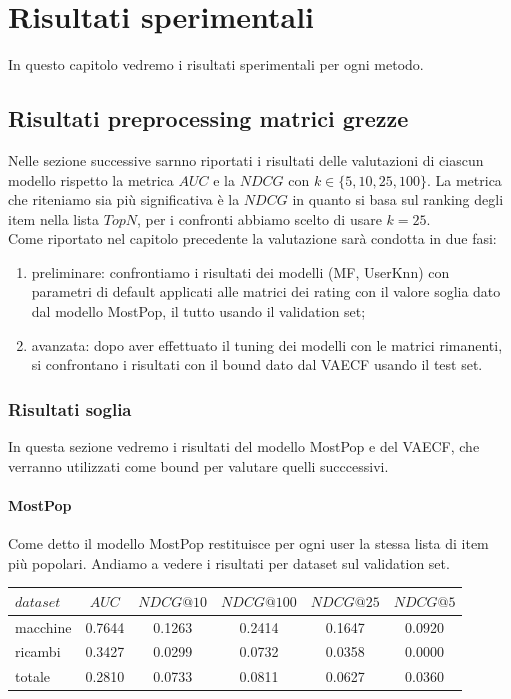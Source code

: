 \hypertarget{(chap:capitolo6)}{}
\chapter{Risultati sperimentali}
In questo capitolo vedremo i risultati sperimentali per ogni metodo.
\section{Risultati preprocessing matrici grezze}
Nelle sezione successive sarnno riportati i risultati delle valutazioni di ciascun modello rispetto la metrica $AUC$ e la $NDCG$ con $k\in \{5, 10, 25, 100\}$.
La metrica che riteniamo sia più significativa è la $NDCG$ in quanto si basa sul ranking degli item nella lista $TopN$, per i confronti abbiamo scelto di usare $k=25$.\\
Come riportato nel capitolo precedente la valutazione sarà condotta in due fasi: 
\begin{enumerate}
    \item preliminare: confrontiamo i risultati dei modelli (MF, UserKnn) con parametri di default applicati alle matrici dei rating con il valore soglia dato dal modello MostPop, il tutto usando il validation set;
    \item avanzata: dopo aver effettuato il tuning dei modelli con le matrici rimanenti, si confrontano i risultati con il bound dato dal VAECF usando il test set.
\end{enumerate} 

\subsection{Risultati soglia}
In questa sezione vedremo i risultati del modello MostPop e del VAECF, che verranno utilizzati come bound per valutare quelli succcessivi. 

\subsubsection{MostPop}
Come detto il modello MostPop restituisce per ogni user la stessa lista di item più popolari.
Andiamo a vedere i risultati per dataset sul validation set.\\

\begin{tabular}{|l|c|cccc|}
    \toprule
    $dataset$ &    $AUC$ &  $NDCG@10$ & $NDCG@100$  & $NDCG@25$ & $NDCG@5$  \\
    \midrule
    macchine & 0.7644 & 0.1263 &   0.2414 &  0.1647 & 0.0920 \\
    ricambi  & 0.3427 &  0.0299 &   0.0732 &  0.0358 & 0.0000 \\
    totale  & 0.2810 &  0.0733 &   0.0811 &  0.0627 & 0.0360 \\

\bottomrule
\end{tabular}\\

